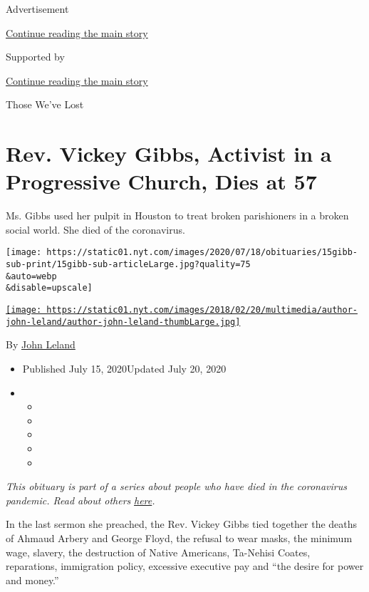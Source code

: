 Advertisement

\protect\hyperlink{after-top}{Continue reading the main story}

Supported by

\protect\hyperlink{after-sponsor}{Continue reading the main story}

Those We've Lost

\hypertarget{rev-vickey-gibbs-activist-in-a-progressive-church-dies-at-57}{%
\section{Rev. Vickey Gibbs, Activist in a Progressive Church, Dies at
57}\label{rev-vickey-gibbs-activist-in-a-progressive-church-dies-at-57}}

Ms. Gibbs used her pulpit in Houston to treat broken parishioners in a
broken social world. She died of the coronavirus.

\texttt{[image: https://static01.nyt.com/images/2020/07/18/obituaries/15gibb-sub-print/15gibb-sub-articleLarge.jpg?quality=75\\\&auto=webp\\\&disable=upscale]}

\href{https://www.nytimes.com/by/john-leland}{\texttt{[image: https://static01.nyt.com/images/2018/02/20/multimedia/author-john-leland/author-john-leland-thumbLarge.jpg]}}

By \href{https://www.nytimes.com/by/john-leland}{John Leland}

\begin{itemize}
\item
  Published July 15, 2020Updated July 20, 2020
\item
  \begin{itemize}
  \item
  \item
  \item
  \item
  \item
  \end{itemize}
\end{itemize}

\emph{This obituary is part of a series about people who have died in
the coronavirus pandemic. Read about others}
\href{https://www.nytimes.com/interactive/2020/obituaries/people-died-coronavirus-obituaries.html}{\emph{here}}\emph{.}

In the last sermon she preached, the Rev. Vickey Gibbs tied together the
deaths of Ahmaud Arbery and George Floyd, the refusal to wear masks, the
minimum wage, slavery, the destruction of Native Americans, Ta-Nehisi
Coates, reparations, immigration policy, excessive executive pay and
``the desire for power and money.''

